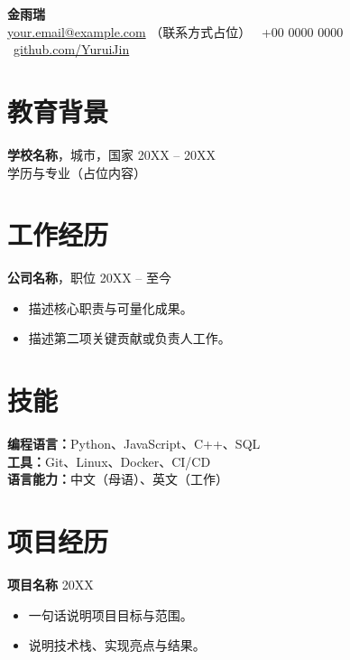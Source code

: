 \documentclass[11pt,a4paper]{ctexart}
\begin{document}
{\LARGE \textbf{金雨瑞}}\\
\href{mailto:your.email@example.com}{your.email@example.com}
（联系方式占位） \textbar\
+00 0000 0000 \textbar\
\href{https://github.com/YuruiJin}{github.com/YuruiJin}

\section*{教育背景}
\textbf{学校名称}，城市，国家 \hfill 20XX -- 20XX\\
学历与专业（占位内容）

\section*{工作经历}
\textbf{公司名称}，职位 \hfill 20XX -- 至今
\begin{itemize}
  \item 描述核心职责与可量化成果。
  \item 描述第二项关键贡献或负责人工作。
\end{itemize}

\section*{技能}
\textbf{编程语言：}Python、JavaScript、C++、SQL\\
\textbf{工具：}Git、Linux、Docker、CI/CD\\
\textbf{语言能力：}中文（母语）、英文（工作）

\section*{项目经历}
\textbf{项目名称} \hfill 20XX
\begin{itemize}
  \item 一句话说明项目目标与范围。
  \item 说明技术栈、实现亮点与结果。
\end{itemize}
\end{document}

